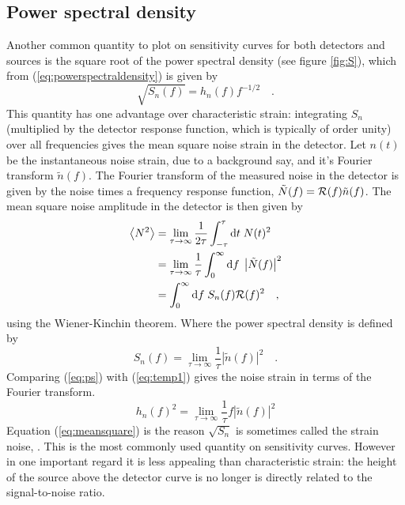 \documentclass[fleqn,12pt]{iopart}
\begin{document}
\subsection{Power spectral density}\label{sec:psd}
Another common quantity to plot on sensitivity curves for both detectors and sources is the square root of the power spectral density (see figure \ref{fig:S}), which from (\ref{eq:powerspectraldensity}) is given by
\begin{equation}\label{eq:temp1} \sqrt{S_{n}(f)}=h_{n}(f)f^{-1/2} \quad .\end{equation}
This quantity has one advantage over characteristic strain: integrating $S_{n}$ (multiplied by the detector response function, which is typically of order unity) over all frequencies gives the mean square noise strain in the detector. Let $n(t)$ be the instantaneous noise strain, due to a background say, and it's Fourier transform $\tilde{n}(f)$. The Fourier transform of the measured noise in the detector is given by the noise times a frequency response function, $\tilde{N}(f)={\cal{R}}(f)\tilde{n}(f)$. The mean square noise amplitude in the detector is then given by
\begin{eqnarray} \label{eq:meansquare}
\left< N^{2} \right> &= \lim_{\tau \rightarrow \infty} \frac{1}{2\tau} \int_{-\tau}^{\tau}\textrm{d}t\; N(t)^{2} \nonumber \\
&=\lim_{\tau\rightarrow\infty}\frac{1}{\tau}\int_{0}^{\infty}\textrm{d}f\;\left|\tilde{N}(f)\right|^{2} \nonumber\\
&= \int_{0}^{\infty}\textrm{d}f\; S_{n}(f){\cal{R}}(f)^{2} \quad ,
\end{eqnarray}
using the Wiener-Kinchin theorem. Where the power spectral density is defined by
\begin{equation}\label{eq:ps} S_{n}(f)=\lim_{\tau\rightarrow\infty}\frac{1}{\tau}\left|\tilde{n}(f)\right|^{2} \quad . \end{equation}
Comparing (\ref{eq:ps}) with (\ref{eq:temp1}) gives the noise strain in terms of the Fourier transform.
\begin{equation} h_{n}(f)^{2}=\lim_{\tau\rightarrow\infty}\frac{1}{\tau}f\left| \tilde{n}(f) \right|^{2} \end{equation}
Equation (\ref{eq:meansquare}) is the reason $\sqrt{S_{n}}$ is sometimes called the strain noise, \cite{Phinney}. This is the most commonly used quantity on sensitivity curves. However in one important regard it is less appealing than characteristic strain: the height of the source above the detector curve is no longer is directly related to the signal-to-noise ratio.
\end{document}
